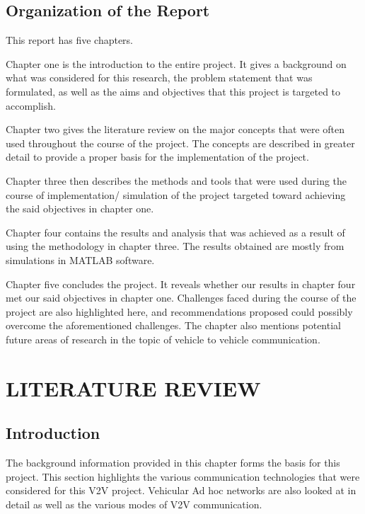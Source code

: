 \documentclass[12pt]{report}
\begin{document}
\section{Organization of the Report}

This report has five chapters. 

Chapter one is the introduction to the entire project. It gives a background on what was considered for this research, the problem statement that was formulated, as well as the aims and objectives that this project is targeted to accomplish.

Chapter two gives the literature review on the major concepts that were often used throughout the course of the project. The concepts are described in greater detail to provide a proper basis for the implementation of the project.

Chapter three then describes the methods and tools that were used during the course of implementation/ simulation of the project targeted toward achieving the said objectives in chapter one.

Chapter four contains the results and analysis that was achieved as a result of using the methodology in chapter three. The results obtained are mostly from simulations in MATLAB software.

Chapter five concludes the project. It reveals whether our results in chapter four met our said objectives in chapter one. Challenges faced during the course of the project are also highlighted here, and recommendations proposed could possibly overcome the aforementioned challenges. The chapter also mentions potential future areas of research in the topic of vehicle to vehicle communication.




\chapter{LITERATURE REVIEW}

\section{Introduction}

The background information provided in this chapter forms the basis for this project. This section highlights the various communication technologies that were considered for this V2V project. Vehicular Ad hoc networks are also looked at in detail as well as the various modes of V2V communication.
\end{document}
